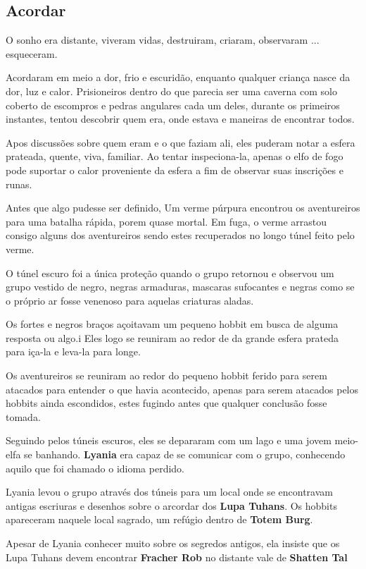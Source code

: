 \subsection{Acordar}

O sonho era distante, viveram vidas, destruiram, criaram, observaram ... esqueceram.

Acordaram em meio a dor, frio e escurid\~ao, enquanto qualquer crian\c{c}a nasce da dor, luz e calor.
Prisioneiros dentro do que parecia ser uma caverna com solo coberto de escompros e pedras
angulares cada um deles, durante os primeiros instantes,
tentou descobrir quem era, onde estava e maneiras de encontrar todos.

Apos discuss\~oes sobre quem eram e o que faziam ali, eles puderam notar a esfera prateada, quente, viva, familiar.
Ao tentar inspeciona-la, apenas o elfo de fogo pode suportar o calor proveniente da
esfera a fim de observar suas inscri\c{c}\~oes e runas.

Antes que algo pudesse ser definido, Um verme p\'urpura encontrou os aventureiros para uma batalha
r\'apida, porem quase mortal. Em fuga, o verme arrastou consigo alguns dos aventureiros sendo estes
recuperados no longo t\'unel feito pelo verme.

O t\'unel escuro foi a \'unica prote\c{c}\~ao quando o grupo retornou e observou um grupo vestido de negro, negras
armaduras, mascaras sufocantes e negras como se o pr\'oprio ar fosse venenoso para aquelas criaturas aladas.

Os fortes e negros bra\c{c}os a\c{c}oitavam um pequeno hobbit em busca de alguma resposta ou algo.i
Eles logo se reuniram ao redor de da grande esfera prateda para i\c{c}a-la e leva-la para longe.

Os aventureiros se reuniram ao redor do pequeno hobbit ferido para serem
atacados para entender o que havia acontecido, apenas para serem atacados pelos hobbits ainda escondidos,
estes fugindo antes que qualquer conclus\~ao fosse tomada.

Seguindo pelos t\'uneis escuros, eles se depararam com um lago e uma jovem
meio-elfa se banhando. \textbf{Lyania} era capaz de se comunicar com o grupo, conhecendo aquilo
que foi chamado o idioma perdido.

Lyania levou o grupo atrav\'es dos t\'uneis para um local onde se encontravam
antigas escriuras e desenhos sobre o arcordar dos \textbf{Lupa Tuhans}.
Os hobbits apareceram naquele local sagrado, um ref\'ugio dentro de \textbf{Totem Burg}.

Apesar de Lyania conhecer muito sobre os segredos antigos, ela insiste que
os Lupa Tuhans devem encontrar \textbf{Fracher Rob} no distante vale
de \textbf{Shatten Tal}
